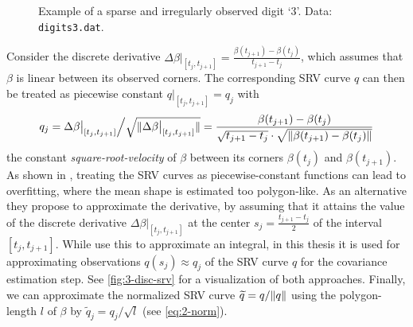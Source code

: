 \begin{figure}
  \centering
  \begin{subfigure}{.48\textwidth}
    \centering
  \end{subfigure}\hfill%
  \begin{subfigure}{.48\textwidth}
    \centering
    \begin{subfigure}{\textwidth}
      \centering
    \end{subfigure}
    \begin{subfigure}{\textwidth}
      \centering
    \end{subfigure}
  \end{subfigure}
  \caption{Example of a sparse and irregularly observed digit \enquote*{3}. Data: \texttt{digits3.dat}.}
  \label{fig:3-disc}
\end{figure}

Consider the discrete derivative $\Delta \beta \big\rvert_{[t_j, t_{j+1}]} = \frac{\beta(t_{j+1}) - \beta(t_{j})}{t_{j+1} - t_j}$, which assumes that $\beta$ is linear between its observed corners. 
The corresponding SRV curve $q$ can then be treated as piecewise constant $q\big\rvert_{[t_{j},t_{j+1}]} = q_j$ with 
\begin{equation}
  q_j = \Delta \beta \big\rvert_{[t_j, t_{j+1}]} \Big/ \sqrt{\lVert\Delta \beta \big\rvert_{[t_j, t_{j+1}]}\rVert} = \frac{\beta(t_{j+1}) - \beta(t_j)}{\sqrt{t_{j+1} - t_j} \cdot \sqrt{\lVert\beta(t_{j+1}) - \beta(t_j)\rVert}}
\end{equation}
the constant \emph{square-root-velocity} of $\beta$ between its corners $\beta(t_j)$ and $\beta(t_{j+1})$.
As shown in \cite[][Fig.\ 3]{Steyer2021}, treating the SRV curves as piecewise-constant functions can lead to overfitting, where the mean shape is estimated too polygon-like.
As an alternative they propose to approximate the derivative, by assuming that it attains the value of the discrete derivative $\Delta \beta \big\rvert_{[t_j,t_{j+1}]}$ at the center $s_j = \frac{t_{j+1} - t_j}{2}$ of the interval $[t_j, t_{j+1}]$.
While \citeauthor{Steyer2021} use this to approximate an integral, in this thesis it is used for approximating observations $q(s_j) \approx q_j$ of the SRV curve $q$ for the covariance estimation step.
See \cref{fig:3-disc-srv} for a visualization of both approaches.
Finally, we can approximate the normalized SRV curve $\widetilde q = q / \lVert q\rVert$ using the polygon-length $l$ of $\beta$ by $\widetilde q_j = q_j \big/ \sqrt{l}$ (see \cref{eq:2-norm}).

